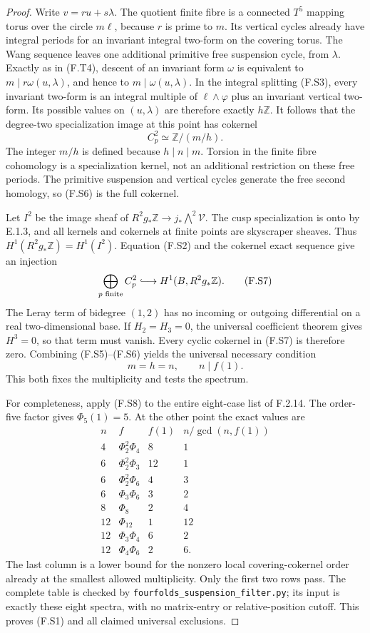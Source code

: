 \begin{proof}
Write $v=ru+s\lambda$.  The quotient finite fibre is a
connected $T^5$ mapping torus over the circle $m\ell$,
because $r$ is prime to $m$.
Its vertical cycles already have integral periods for an
invariant integral two-form on the covering torus.
The Wang sequence leaves one additional primitive free
suspension cycle, from $\lambda$.
Exactly as in (F.T4), descent of an invariant form $\omega$
is equivalent to
$m\mid r\omega(u,\lambda)$, and hence to
$m\mid\omega(u,\lambda)$.
In the integral splitting (F.S3), every invariant two-form
is an integral multiple of $\ell\wedge\varphi$ plus an
invariant vertical two-form.  Its possible values on
$(u,\lambda)$ are therefore exactly $h\mathbb Z$.
It follows that the degree-two specialization image at
this point has cokernel
\[
 C^2_p\simeq\mathbb Z/(m/h).
 \tag{F.S6}
\]
The integer $m/h$ is defined because $h\mid n\mid m$.
Torsion in the finite fibre cohomology is a specialization
kernel, not an additional restriction on these free periods.
The primitive suspension and vertical cycles generate the
free second homology, so (F.S6) is the full cokernel.

Let $I^2$ be the image sheaf of
$R^2g_*\mathbb Z\to j_*\bigwedge^2\mathcal V$.
The cusp specialization is onto by E.1.3, and all kernels
and cokernels at finite points are skyscraper sheaves.
Thus $H^1(R^2g_*\mathbb Z)=H^1(I^2)$.
Equation (F.S2) and the cokernel exact sequence give an
injection
\[
 \bigoplus_{p\text{ finite}}C^2_p
           \lhook\joinrel\longrightarrow H^1(B,R^2g_*\mathbb Z).
 \tag{F.S7}
\]
The Leray term of bidegree $(1,2)$ has no incoming or
outgoing differential on a real two-dimensional base.
If $H_2=H_3=0$, the universal coefficient theorem gives
$H^3=0$, so that term must vanish.
Every cyclic cokernel in (F.S7) is therefore zero.
Combining (F.S5)--(F.S6) yields the universal necessary
condition
\[
 m=h=n,\qquad n\mid f(1).
 \tag{F.S8}
\]
This both fixes the multiplicity and tests the spectrum.

For completeness, apply (F.S8) to the entire eight-case
list of F.2.14.  The order-five factor gives $\Phi_5(1)=5$.
At the other point the exact values are
\[
\begin{array}{c|c|r|r}
 n&f&f(1)&n/\gcd(n,f(1))\\\hline
 4&\Phi_2^2\Phi_4&8&1\\
 6&\Phi_2^2\Phi_3&12&1\\
 6&\Phi_2^2\Phi_6&4&3\\
 6&\Phi_3\Phi_6&3&2\\
 8&\Phi_8&2&4\\
 12&\Phi_{12}&1&12\\
 12&\Phi_3\Phi_4&6&2\\
 12&\Phi_4\Phi_6&2&6.
\end{array}
 \tag{F.S9}
\]
The last column is a lower bound for the nonzero local
covering-cokernel order already at the smallest allowed
multiplicity.  Only the first two rows pass.
The complete table is checked by
\texttt{fourfolds\_suspension\_filter.py}; its input is
exactly these eight spectra, with no matrix-entry or
relative-position cutoff.  This proves (F.S1) and all
claimed universal exclusions.
\end{proof}
